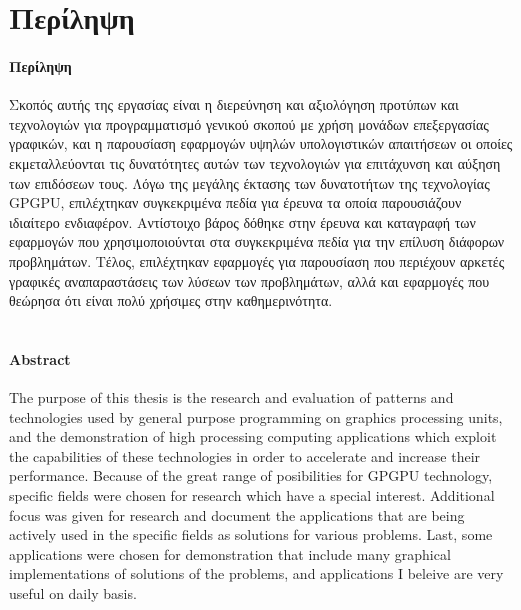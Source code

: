 \chapter{Περίληψη}
\subsubsection{Περίληψη}
Σκοπός αυτής της εργασίας είναι η διερεύνηση και αξιολόγηση προτύπων και τεχνολογιών για προγραμματισμό γενικού σκοπού με χρήση μονάδων επεξεργασίας γραφικών, και η παρουσίαση εφαρμογών υψηλών υπολογιστικών απαιτήσεων οι οποίες εκμεταλλεύονται τις δυνατότητες αυτών των τεχνολογιών για επιτάχυνση και αύξηση των επιδόσεων τους. Λόγω της μεγάλης έκτασης των δυνατοτήτων της τεχνολογίας GPGPU, επιλέχτηκαν συγκεκριμένα πεδία για έρευνα τα οποία παρουσιάζουν ιδιαίτερο ενδιαφέρον. Αντίστοιχο βάρος δόθηκε στην έρευνα και καταγραφή των εφαρμογών που χρησιμοποιούνται στα συγκεκριμένα πεδία για την επίλυση διάφορων προβλημάτων. Τέλος, επιλέχτηκαν εφαρμογές για παρουσίαση που περιέχουν αρκετές γραφικές αναπαραστάσεις των λύσεων των προβλημάτων, αλλά και εφαρμογές που θεώρησα ότι είναι πολύ χρήσιμες στην καθημερινότητα.
\\
\\
\subsubsection{Abstract}
The purpose of this thesis is the research and evaluation of patterns and technologies used by general purpose programming on graphics processing units, and the demonstration of high processing computing applications which exploit the capabilities of these technologies in order to accelerate and increase their performance. Because of the great range of posibilities for GPGPU technology, specific fields were chosen for research which have a special interest. Additional focus was given for research and document the applications that are being actively used in the specific fields as solutions for various problems. Last, some applications were chosen for demonstration that include many graphical implementations of solutions of the problems, and applications I beleive are very useful on daily basis.

\newpage